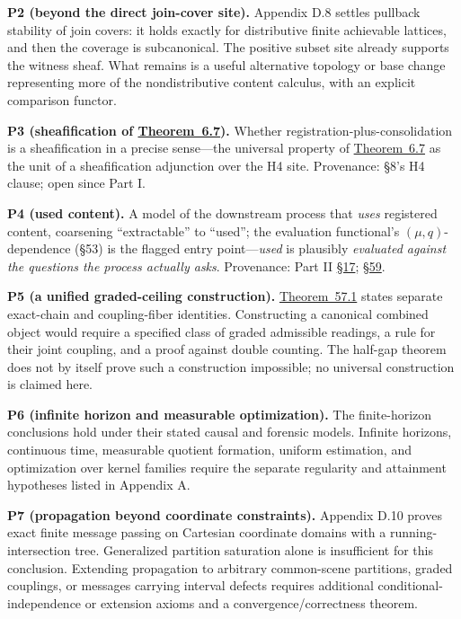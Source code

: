 \textbf{P2 (beyond the direct join-cover site).} Appendix D.8 settles pullback stability of join covers: it holds exactly for distributive finite achievable lattices, and then the coverage is subcanonical. The positive subset site already supports the witness sheaf. What remains is a useful alternative topology or base change representing more of the nondistributive content calculus, with an explicit comparison functor.

\textbf{P3 (sheafification of \hyperlink{stmt:6.7}{Theorem~6.7}).} Whether registration-plus-consolidation is a sheafification in a precise sense---\hspace{0pt}the universal property of \hyperlink{stmt:6.7}{Theorem~6.7} as the unit of a sheafification adjunction over the H4 site. Provenance: §8's H4 clause; open since Part I.

\textbf{P4 (used content).} A model of the downstream process that \emph{uses} registered content, coarsening ``extractable'' to ``used''; the evaluation functional's \((\mu, q)\)-dependence (§53) is the flagged entry point---\hspace{0pt}\emph{used} is plausibly \emph{evaluated against the questions the process actually asks}. Provenance: Part II \hyperlink{sec:17}{§17}; \hyperlink{sec:59}{§59}.

\textbf{P5 (a unified graded-ceiling construction).} \hyperlink{stmt:57.1}{Theorem~57.1} states separate exact-chain and coupling-fiber identities. Constructing a canonical combined object would require a specified class of graded admissible readings, a rule for their joint coupling, and a proof against double counting. The half-gap theorem does not by itself prove such a construction impossible; no universal construction is claimed here.

\textbf{P6 (infinite horizon and measurable optimization).} The finite-horizon conclusions hold under their stated causal and forensic models. Infinite horizons, continuous time, measurable quotient formation, uniform estimation, and optimization over kernel families require the separate regularity and attainment hypotheses listed in Appendix A.

\textbf{P7 (propagation beyond coordinate constraints).} Appendix D.10 proves exact finite message passing on Cartesian coordinate domains with a running-intersection tree. Generalized partition saturation alone is insufficient for this conclusion. Extending propagation to arbitrary common-scene partitions, graded couplings, or messages carrying interval defects requires additional conditional-independence or extension axioms and a convergence/correctness theorem.

